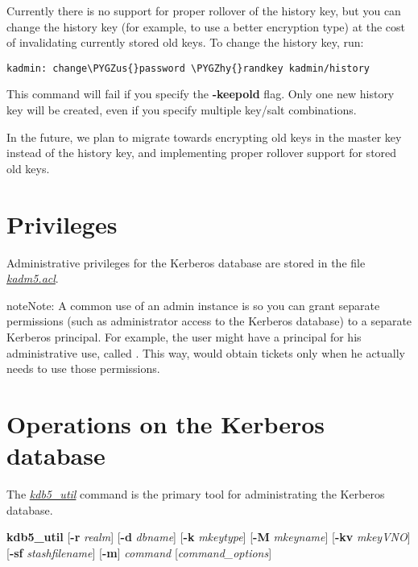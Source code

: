 \documentclass[letterpaper,10pt,english]{sphinxmanual}
\def\PYGZus{\char`\_}
\def\PYGZhy{\char`\-}
\begin{document}
Currently there is no support for proper rollover of the history key,
but you can change the history key (for example, to use a better
encryption type) at the cost of invalidating currently stored old
keys.  To change the history key, run:

\begin{Verbatim}[commandchars=\\\{\}]
kadmin: change\PYGZus{}password \PYGZhy{}randkey kadmin/history
\end{Verbatim}

This command will fail if you specify the \textbf{-keepold} flag.  Only one
new history key will be created, even if you specify multiple key/salt
combinations.

In the future, we plan to migrate towards encrypting old keys in the
master key instead of the history key, and implementing proper
rollover support for stored old keys.


\section{Privileges}
\label{admin/database:privileges}\label{admin/database:id2}
Administrative privileges for the Kerberos database are stored in the
file {\hyperref[admin/conf_files/kadm5_acl:kadm5-acl-5]{\emph{kadm5.acl}}}.

\begin{notice}{note}{Note:}
A common use of an admin instance is so you can grant
separate permissions (such as administrator access to the
Kerberos database) to a separate Kerberos principal. For
example, the user  might have a principal for
his administrative use, called .  This
way,  would obtain  tickets
only when he actually needs to use those permissions.
\end{notice}


\section{Operations on the Kerberos database}
\label{admin/database:db-operations}\label{admin/database:operations-on-the-kerberos-database}
The {\hyperref[admin/admin_commands/kdb5_util:kdb5-util-8]{\emph{kdb5\_util}}} command is the primary tool for administrating
the Kerberos database.

\textbf{kdb5\_util}
{[}\textbf{-r} \emph{realm}{]}
{[}\textbf{-d} \emph{dbname}{]}
{[}\textbf{-k} \emph{mkeytype}{]}
{[}\textbf{-M} \emph{mkeyname}{]}
{[}\textbf{-kv} \emph{mkeyVNO}{]}
{[}\textbf{-sf} \emph{stashfilename}{]}
{[}\textbf{-m}{]}
\emph{command} {[}\emph{command\_options}{]}
\end{document}
